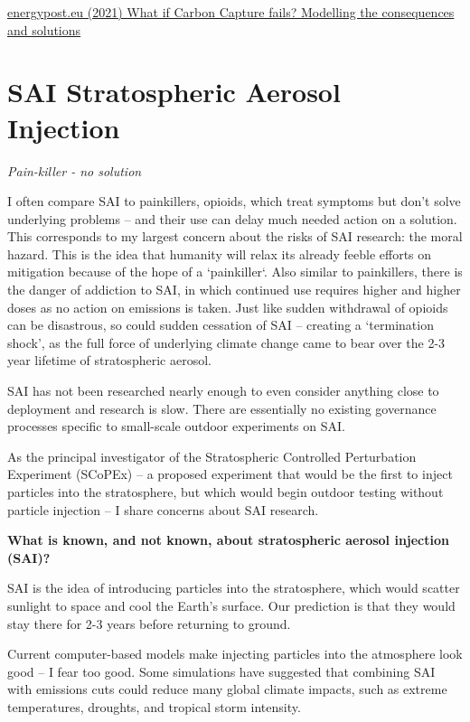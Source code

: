 \documentclass[
]{book}
\begin{document}
\href{https://energypost.eu/what-if-carbon-capture-fails-modelling-the-consequences-and-solutions/}{energypost.eu (2021) What if Carbon Capture fails? Modelling the consequences and solutions}

\hypertarget{sai-stratospheric-aerosol-injection}{%
\chapter{SAI Stratospheric Aerosol Injection}\label{sai-stratospheric-aerosol-injection}}

\emph{Pain-killer - no solution}

I often compare SAI to painkillers, opioids, which treat symptoms but don't solve underlying problems -- and their use can delay much needed action on a solution.
This corresponds to my largest concern about the risks of SAI research: the moral hazard. This is the idea that humanity will relax its already feeble efforts on mitigation because of the hope of a `painkiller`.
Also similar to painkillers, there is the danger of addiction to SAI, in which continued use requires higher and higher doses as no action on emissions is taken. Just like sudden withdrawal of opioids can be disastrous, so could sudden cessation of SAI -- creating a `termination shock', as the full force of underlying climate change came to bear over the 2-3 year lifetime of stratospheric aerosol.

SAI has not been researched nearly enough to even consider anything close to deployment and research is slow. There are essentially no existing governance processes specific to small-scale outdoor experiments on SAI.

As the principal investigator of the Stratospheric Controlled Perturbation Experiment (SCoPEx) -- a proposed experiment that would be the first to inject particles into the stratosphere, but which would begin outdoor testing without particle injection -- I share concerns about SAI research.

\textbf{What is known, and not known, about stratospheric aerosol injection (SAI)?}

SAI is the idea of introducing particles into the stratosphere, which would scatter sunlight to space and cool the Earth's surface. Our prediction is that they would stay there for 2-3 years before returning to ground.

Current computer-based models make injecting particles into the atmosphere look good -- I fear too good. Some simulations have suggested that combining SAI with emissions cuts could reduce many global climate impacts, such as extreme temperatures, droughts, and tropical storm intensity.
\end{document}
